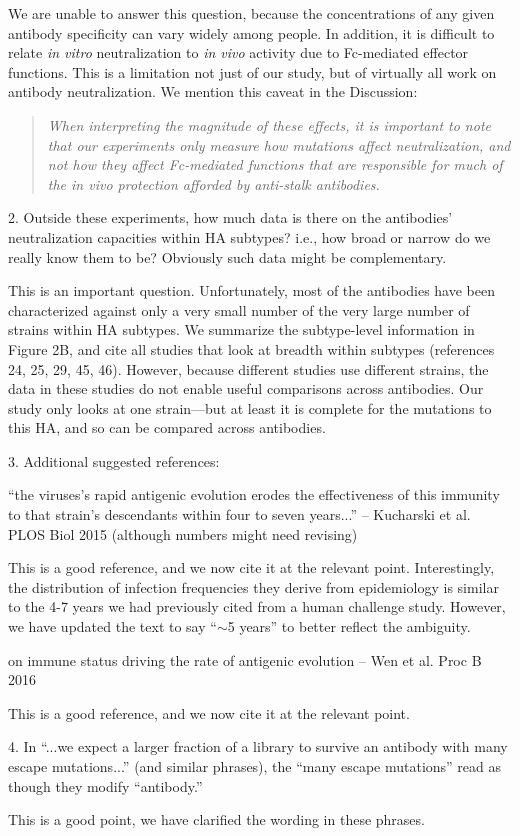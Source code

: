\documentclass[11pt, oneside]{article}   	%
\begin{document}
{\color{black}
We are unable to answer this question, because the concentrations of any given antibody specificity can vary widely among people.
In addition, it is difficult to relate \textit{in vitro} neutralization to \textit{in vivo} activity due to Fc-mediated effector functions.
This is a limitation not just of our study, but of virtually all work on antibody neutralization.
We mention this caveat in the Discussion:
\begin{quote}
\textsl{When interpreting the magnitude of these effects, it is important to note that our experiments only measure how mutations affect neutralization, and not how they affect Fc-mediated functions that are responsible for much of the in vivo protection afforded by anti-stalk antibodies.}
\end{quote}
}

2. Outside these experiments, how much data is there on the antibodies' neutralization capacities within HA subtypes? i.e., how broad or narrow do we really know them to be? Obviously such data might be complementary. 

{\color{black}
This is an important question.
Unfortunately, most of the antibodies have been characterized against only a very small number of the very large number of strains within HA subtypes.
We summarize the subtype-level information in Figure 2B, and cite all studies that look at breadth within subtypes (references 24, 25, 29, 45, 46).
However, because different studies use different strains, the data in these studies do not enable useful comparisons across antibodies.
Our study only looks at one strain---but at least it is complete for the mutations to this HA, and so can be compared across antibodies.}

3. Additional suggested references: 

``the viruses's rapid antigenic evolution erodes the effectiveness of this immunity to that strain's descendants within four to seven years...'' -- Kucharski et al. PLOS Biol 2015 (although numbers might need revising)

{\color{black}
This is a good reference, and we now cite it at the relevant point.
Interestingly, the distribution of infection frequencies they derive from epidemiology is similar to the 4-7 years we had previously cited from a human challenge study.
However, we have updated the text to say ``$\sim$5 years'' to better reflect the ambiguity.}

on immune status driving the rate of antigenic evolution -- Wen et al. Proc B 2016

{\color{black}
This is a good reference, and we now cite it at the relevant point.}

4. In ``...we expect a larger fraction of a library to survive an antibody with many escape mutations...'' (and similar phrases), the ``many escape mutations'' read as though they modify ``antibody.''

{\color{black}
This is a good point, we have clarified the wording in these phrases.}
\end{document}
